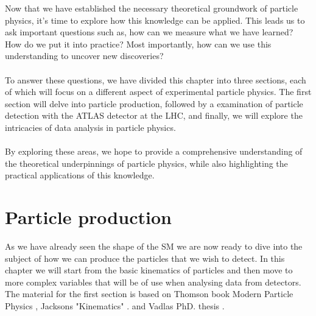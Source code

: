 \documentclass[14pt, a4paper]{book}
\begin{document}
Now that we have established the necessary theoretical groundwork of particle physics, it's time to explore how this knowledge can be applied. This leads us to ask important questions such as, 
how can we measure what we have learned? How do we put it into practice? Most importantly, how can we use this understanding to uncover new discoveries?\\
\\To answer these questions, we have divided this chapter into three sections, each of which will focus on a different aspect of experimental particle physics. The first section will delve into particle production, 
followed by a examination of particle detection with the ATLAS detector at the LHC, and finally, we will explore the intricacies of data analysis in particle physics.\\
\\By exploring these areas, we hope to provide a comprehensive understanding of the theoretical underpinnings of particle physics, while also highlighting the practical applications of this knowledge. 

\clearpage
\section{Particle production}
As we have already seen the shape of the SM we are now ready to dive into the subject of how we can produce the particles that we wish to detect. In this chapter we will start from the basic kinematics of particles 
and then move to more complex variables that will be of use when analysing data from detectors. The material for the first section is based on Thomson book Modern Particle Physics \cite{THOMSON}, Jacksons "Kinematics" \cite{Jackson_kin}.
and Vadlas PhD. thesis \cite{KNUT_VADLA}.
\end{document}
